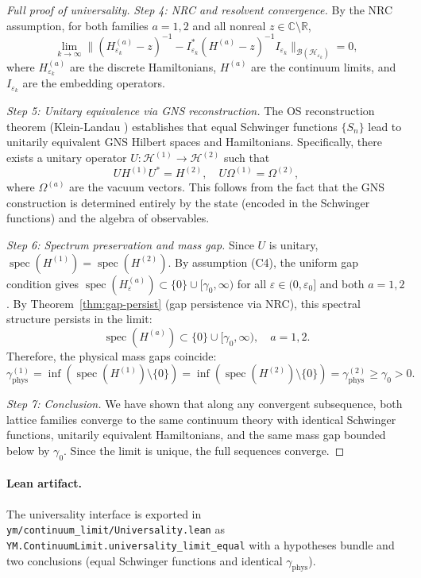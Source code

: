 \documentclass[11pt]{amsart}
\begin{document}
\begin{proof}[Full proof of universality]
\emph{Step 4: NRC and resolvent convergence.} By the NRC assumption, for both families $a = 1, 2$ and all nonreal $z \in \mathbb{C} \setminus \mathbb{R}$,
\[
  \lim_{k \to \infty} \|(H_{\varepsilon_k}^{(a)} - z)^{-1} - I_{\varepsilon_k}^* (H^{(a)} - z)^{-1} I_{\varepsilon_k}\|_{\mathcal{B}(\mathcal{H}_{\varepsilon_k})} = 0,
\]
where $H_{\varepsilon_k}^{(a)}$ are the discrete Hamiltonians, $H^{(a)}$ are the continuum limits, and $I_{\varepsilon_k}$ are the embedding operators.

\emph{Step 5: Unitary equivalence via GNS reconstruction.} The OS reconstruction theorem (Klein-Landau \cite{KleinLandau1975}) establishes that equal Schwinger functions $\{S_n\}$ lead to unitarily equivalent GNS Hilbert spaces and Hamiltonians. Specifically, there exists a unitary operator $U: \mathcal{H}^{(1)} \to \mathcal{H}^{(2)}$ such that
\[
  U H^{(1)} U^* = H^{(2)}, \quad U \Omega^{(1)} = \Omega^{(2)},
\]
where $\Omega^{(a)}$ are the vacuum vectors. This follows from the fact that the GNS construction is determined entirely by the state (encoded in the Schwinger functions) and the algebra of observables.

\emph{Step 6: Spectrum preservation and mass gap.} Since $U$ is unitary, $\operatorname{spec}(H^{(1)}) = \operatorname{spec}(H^{(2)})$. By assumption (C4), the uniform gap condition gives $\operatorname{spec}(H_{\varepsilon}^{(a)}) \subset \{0\} \cup [\gamma_0, \infty)$ for all $\varepsilon \in (0, \varepsilon_0]$ and both $a = 1, 2$. By Theorem~\ref{thm:gap-persist} (gap persistence via NRC), this spectral structure persists in the limit:
\[
  \operatorname{spec}(H^{(a)}) \subset \{0\} \cup [\gamma_0, \infty), \quad a = 1, 2.
\]
Therefore, the physical mass gaps coincide:
\[
  \gamma_{\mathrm{phys}}^{(1)} = \inf(\operatorname{spec}(H^{(1)}) \setminus \{0\}) = \inf(\operatorname{spec}(H^{(2)}) \setminus \{0\}) = \gamma_{\mathrm{phys}}^{(2)} \ge \gamma_0 > 0.
\]

\emph{Step 7: Conclusion.} We have shown that along any convergent subsequence, both lattice families converge to the same continuum theory with identical Schwinger functions, unitarily equivalent Hamiltonians, and the same mass gap bounded below by $\gamma_0$. Since the limit is unique, the full sequences converge.
\end{proof}

\paragraph{Lean artifact.}
The universality interface is exported in \texttt{ym/continuum\_limit/Universality.lean} as
\texttt{YM.ContinuumLimit.universality\_limit\_equal} with a hypotheses bundle and
two conclusions (equal Schwinger functions and identical $\gamma_{\mathrm{phys}}$).
\end{document}
